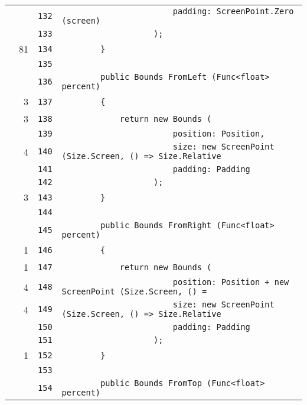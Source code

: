 \documentclass[a4paper,10pt]{article}
\begin{document}
\begin{longtable}[l]{lrrl}
\cellcolor{gray} &  & \verb~132~ & \verb~                       padding: ScreenPoint.Zero (screen)~\\
\cellcolor{gray} &  & \verb~133~ & \verb~                   );~\\
\cellcolor{green} & 81 & \verb~134~ & \verb~        }~\\
\cellcolor{gray} &  & \verb~135~ & \verb~~\\
\cellcolor{gray} &  & \verb~136~ & \verb~        public Bounds FromLeft (Func<float> percent)~\\
\cellcolor{green} & 3 & \verb~137~ & \verb~        {~\\
\cellcolor{green} & 3 & \verb~138~ & \verb~            return new Bounds (~\\
\cellcolor{gray} &  & \verb~139~ & \verb~                       position: Position,~\\
\cellcolor{green} & 4 & \verb~140~ & \verb~                       size: new ScreenPoint (Size.Screen, () => Size.Relative~\\
\cellcolor{gray} &  & \verb~141~ & \verb~                       padding: Padding~\\
\cellcolor{gray} &  & \verb~142~ & \verb~                   );~\\
\cellcolor{green} & 3 & \verb~143~ & \verb~        }~\\
\cellcolor{gray} &  & \verb~144~ & \verb~~\\
\cellcolor{gray} &  & \verb~145~ & \verb~        public Bounds FromRight (Func<float> percent)~\\
\cellcolor{green} & 1 & \verb~146~ & \verb~        {~\\
\cellcolor{green} & 1 & \verb~147~ & \verb~            return new Bounds (~\\
\cellcolor{green} & 4 & \verb~148~ & \verb~                       position: Position + new ScreenPoint (Size.Screen, () =~\\
\cellcolor{green} & 4 & \verb~149~ & \verb~                       size: new ScreenPoint (Size.Screen, () => Size.Relative~\\
\cellcolor{gray} &  & \verb~150~ & \verb~                       padding: Padding~\\
\cellcolor{gray} &  & \verb~151~ & \verb~                   );~\\
\cellcolor{green} & 1 & \verb~152~ & \verb~        }~\\
\cellcolor{gray} &  & \verb~153~ & \verb~~\\
\cellcolor{gray} &  & \verb~154~ & \verb~        public Bounds FromTop (Func<float> percent)~\\

\end{longtable}
\end{document}
